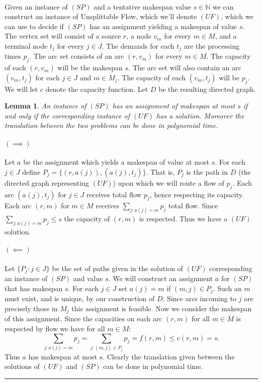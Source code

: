 \documentclass[letterpaper,12pt,oneside,onecolumn]{article}
\newcommand{\N}{\mathbb{N}} \newcommand{\R}{\mathbb{R}}
\newenvironment{proof}{{\bf Proof:  }}{\hfill\rule{2mm}{2mm}}
\newtheorem{lemma}[fact]{Lemma}
\begin{document}
\paragraph{}
Given an instance of $(SP)$ and a tentative makespan value $s \in \N$ we can construct an instance of Unsplittable Flow, which we'll denote $(UF)$, which we can use to decide if $(SP)$ has an assignment yielding a makespan of value $s$. The vertex set will consist of a source $r$, a node $v_m$ for every $m \in M$, and a terminal node $t_j$ for every $j\in J$. The demands for each $t_j$ are the processing times $p_j$. The arc set consists of an arc $(r,v_m)$ for every $m \in M$. The capacity of each $(r,v_m)$ will be the makespan $s$. The arc set will also contain an arc $(v_m, t_j)$ for each $j \in J$ and $m \in M_j$. The capacity of each $(v_m, t_j)$ will be $p_j$. We will let $c$ denote the capacity function. Let $D$ be the resulting directed graph.
\begin{lemma}\label{lemma:sp-uf}
An instance of $(SP)$ has an assignment of makespan at most $s$ if and only if the corresponding instance of $(UF)$ has a solution. Moreover the translation between the two problems can be done in polynomial time.
\end{lemma}
\begin{proof}
\paragraph{$(\implies)$} Let $a$ be the assignment which yields a makespan of value at most $s$. For each $j \in J$ define $P_j = \{ (r,a(j)),(a(j),t_j)\}$. That is, $P_j$ is the path in $D$ (the directed graph representing $(UF)$) upon which we will route a flow of $p_j$. Each arc $(a(j), t_j)$ for $j \in J$ receives total flow $p_j$, hence respecting its capacity. Each arc $(r,m)$ for $m \in M$ receives $\sum_{j : a(j) = m}p_j$ total flow. Since $\sum_{j : a(j) = m} p_j \leq s$ the capacity of $(r,m)$ is respected. Thus we have a $(UF)$ solution.
\paragraph{$(\impliedby)$}
Let $\{P_j : j \in J\}$ be the set of paths given in the solution of $(UF)$ corresponding an instance of $(SP)$ and value $s$. We will construct an assignment $a$ for $(SP)$ that has makespan $s$. For each $j \in J$ set $a(j) = m$ if $(m,j) \in P_j$. Such an $m$ must exist, and is unique, by our construction of $D$. Since arcs incoming to $j$ are precisely those in $M_j$ this assignment is feasible. Now we consider the makespan of this assignment. Since the capacities on each arc $(r,m)$ for all $m \in M$ is respected by flow we have for all $m \in M$:
$$\sum_{j: a(j) = m} p_j = \sum_{j: (m,j) \in P_j} p_j = f(r,m) \leq c(r,m) = s.$$ 
Thus $a$ has makespan at most $s$. Clearly the translation given between the solutions of $(UF)$ and $(SP)$ can be done in polynomial time.
\end{proof}
\end{document}
